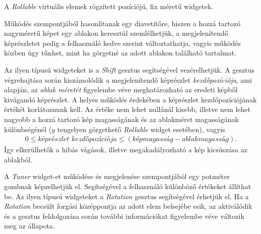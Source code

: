 A \textit{Rollable} virtuális elemek rögzített pozíciójú, fix méretű widgetek.

Működés szempontjából hasonlítanak egy diavetítőre, hiszen a hozzá tartozó nagyméretű képet egy ablakon keresztül szemlélhetjük, a megjelenítendő képrészletet pedig a felhasználó kedve szerint változtathatja, vagyis működés közben úgy tűnhet, mint ha görgetné az adott ablakon található tartalmat.

Az ilyen típusú widgeteket is a \textit{Shift} gesztus segítségével vezérelhetjük. A gesztus végrehajtása során kiszámolódik a megjelenítendő képrészlet \textit{kezdőpozíciója}, ami alapján, az \textit{ablak méretét} figyelembe véve meghatározható az eredeti képből kivágandó képrészlet.
A helyes működés érdekében a képrészlet kezdőpozíciójának értékét korlátoznunk kell. Az értéke nem lehet nullánál kisebb, illetve nem lehet nagyobb a hozzá tartozó kép magasságának és az ablakméret magasságának különbségénél ($y$ tengelyen görgethető \textit{Rollable} widget esetében), vagyis
\begin{align*}
	0 \leq \textit{képrészlet kezdőpozíciója} \leq (\textit{képmagasság} - \textit{ablakmagasság}).
\end{align*}
Így elkerülhetők a hibás vágások, illetve megakadályozható a kép kicsúszása az ablakból.


A \textit{Tuner} widget-et működése és megjelenése szempontjából egy potméter gombnak képzelhetjük el. Segítségével a felhasználó különböző értékeket állíthat be.
Az ilyen típusú widgeteket a \textit{Rotation} gesztus segítségével érhetjük el. Ha a \textit{Rotation} becsült forgási középpontja az adott elem belsejébe esik, az aktiválódik és a gesztus feldolgozása során további információkat figyelembe véve változik meg az állapota.

